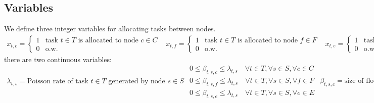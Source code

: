 \documentclass[conference]{IEEEtran}
\begin{document}
    \subsection{Variables}

    We define three integer variables for allocating tasks between nodes.
    \begin{subequations}
      \begin{align}
        x_{t,c} =
        \begin{cases}
          1 & \text{task $t \in T$ is allocated to node $c \in C$} \\
          0 & \text{o.w.}
        \end{cases}
      \end{align}

      \begin{align}
        x_{t,f} =
        \begin{cases}
          1 & \text{task $t \in T$ is allocated to node $f \in F$} \\
          0 & \text{o.w.}
        \end{cases}
      \end{align}

     \begin{align}
       x_{t,e} =
       \begin{cases}
         1 & \text{task $t \in T$ is allocated to node $e \in E$} \\
         0 & \text{o.w.}
      \end{cases}
     \end{align}
  \end{subequations}
  there are two continuous variables:
  \begin{subequations}
     \begin{align}
        \lambda_{t,s} = \text{Poisson rate of task $t \in T$ generated by node $s \in S$}
     \end{align}

     \begin{align}
       0 \le \beta_{t,s,c} \le \lambda_{t,s}  \quad \forall{t \in T}, \forall{s \in S}, \forall{c \in C} \\
       0 \le \beta_{t,s,f} \le \lambda_{t,s}  \quad \forall{t \in T}, \forall{s \in S}, \forall{f \in F} \\
       0 \le \beta_{t,s,e} \le \lambda_{t,s}  \quad \forall{t \in T}, \forall{s \in S}, \forall{e \in E}
     \end{align}

     \begin{align}
       \beta_{t,s,c} = \text{size of flow of task $t \in T$ from node $s \in S$ to node $c \in C$}
     \end{align}
   \end{subequations}
\end{document}
